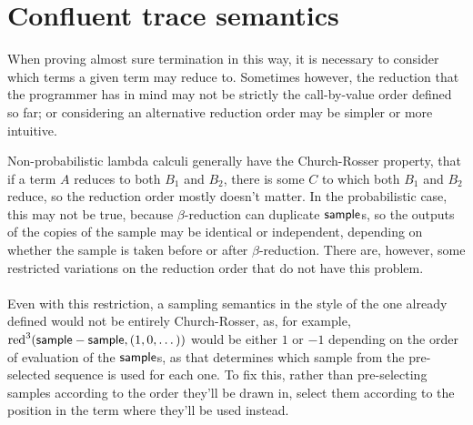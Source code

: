 \section{Confluent trace semantics}
\label{sec:confluent}

When proving almost sure termination in this way, it is necessary to consider which terms a given term may reduce to. Sometimes however, the reduction that the programmer has in mind may not be strictly the call-by-value order defined so far; or considering an alternative reduction order may be simpler or more intuitive.

Non-probabilistic lambda calculi generally have the Church-Rosser property, that if a term $A$ reduces to both $B_1$ and $B_2$, there is some $C$ 
to which both $B_1$ and $B_2$ reduce,
so the reduction order mostly doesn't matter. 
In the probabilistic case, this may not be true, because $\beta$-reduction can duplicate $\mathsf{sample}$s, so the outputs of the copies of the sample may be identical or independent, depending on whether the sample is taken before or after $\beta$-reduction. 
There are, however, some restricted variations on the reduction order that do not have this problem.

\paragraph{}
Even with this restriction, a sampling semantics in the style of the one already defined would not be entirely Church-Rosser, as, for example, $\operatorname{red}^3(\mathsf{sample} - \mathsf{sample}, (1,0,\dots))$ would be either $1$ or $-1$ depending on the order of evaluation of the $\mathsf{sample}$s, as that determines which sample from the pre-selected sequence is used for each one. To fix this, rather than pre-selecting samples according to the order they'll be drawn in, select them according to the position in the term where they'll be used instead.

